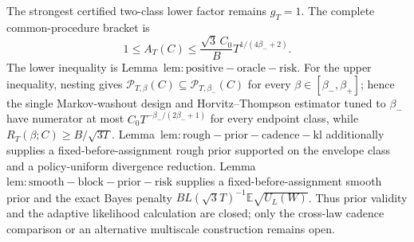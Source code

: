The strongest certified two-class lower factor remains \(g_T=1\). The complete common-procedure bracket is
\[1\le A_T(C)\le \frac{\sqrt{3}\,C_0}{B}T^{1/(4\beta_-+2)}.\]
The lower inequality is Lemma~\(\mathrm{lem:positive-oracle-risk}\). For the upper inequality, nesting gives \(\mathcal P_{T,\beta}(C)\subseteq\mathcal P_{T,\beta_-}(C)\) for every \(\beta\in[\beta_-,\beta_+]\); hence the single Markov-washout design and Horvitz--Thompson estimator tuned to \(\beta_-\) have numerator at most \(C_0T^{-\beta_-/(2\beta_-+1)}\) for every endpoint class, while \(R_T(\beta;C)\ge B/\sqrt{3T}\). Lemma~\(\mathrm{lem:rough-prior-cadence-kl}\) additionally supplies a fixed-before-assignment rough prior supported on the envelope class and a policy-uniform divergence reduction. Lemma~\(\mathrm{lem:smooth-block-prior-risk}\) supplies a fixed-before-assignment smooth prior and the exact Bayes penalty \(BL(\sqrt{3}T)^{-1}\mathbb E\sqrt{U_L(W)}\). Thus prior validity and the adaptive likelihood calculation are closed; only the cross-law cadence comparison or an alternative multiscale construction remains open.
